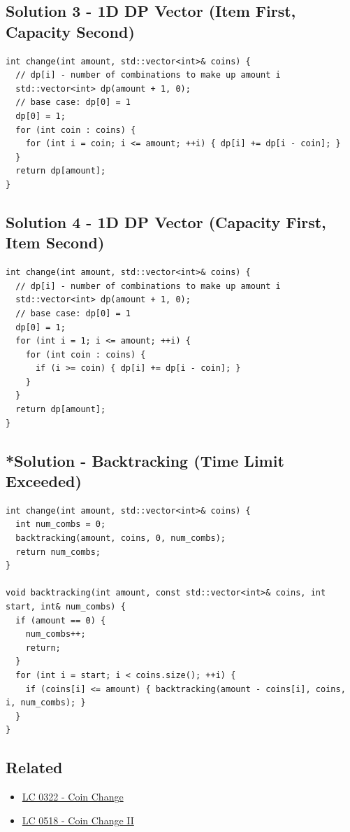 \subsection*{Solution 3 - 1D DP Vector (Item First, Capacity Second)}
\begin{lstlisting}
int change(int amount, std::vector<int>& coins) {
  // dp[i] - number of combinations to make up amount i
  std::vector<int> dp(amount + 1, 0);
  // base case: dp[0] = 1
  dp[0] = 1;
  for (int coin : coins) {
    for (int i = coin; i <= amount; ++i) { dp[i] += dp[i - coin]; }
  }
  return dp[amount];
}
\end{lstlisting}

\subsection*{Solution 4 - 1D DP Vector (Capacity First, Item Second) {\color{red}{(WRONG SOLUTION)}}} 
\begin{lstlisting}
int change(int amount, std::vector<int>& coins) {
  // dp[i] - number of combinations to make up amount i
  std::vector<int> dp(amount + 1, 0);
  // base case: dp[0] = 1
  dp[0] = 1;
  for (int i = 1; i <= amount; ++i) {
    for (int coin : coins) {
      if (i >= coin) { dp[i] += dp[i - coin]; }
    }
  }
  return dp[amount];
}
\end{lstlisting}

\subsection*{*Solution - Backtracking (Time Limit Exceeded)}
\begin{lstlisting}
int change(int amount, std::vector<int>& coins) {
  int num_combs = 0;
  backtracking(amount, coins, 0, num_combs);
  return num_combs;
}

void backtracking(int amount, const std::vector<int>& coins, int start, int& num_combs) {
  if (amount == 0) {
    num_combs++;
    return;
  }
  for (int i = start; i < coins.size(); ++i) {
    if (coins[i] <= amount) { backtracking(amount - coins[i], coins, i, num_combs); }
  }
}
\end{lstlisting}

\subsection*{Related}
\begin{itemize}
\item \hyperref[lc0322]{LC 0322 - Coin Change}
\item \hyperref[lc0518]{LC 0518 - Coin Change II}
\end{itemize}

